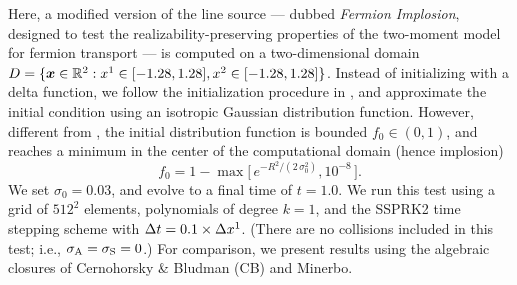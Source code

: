 Here, a modified version of the line source --- dubbed \emph{Fermion Implosion},  designed to test the realizability-preserving properties of the two-moment model for fermion transport --- is computed on a two-dimensional domain $D=\{\boldsymbol{x}\in\mathbb{R}^{2}:x^{1}\in[-1.28,1.28], x^{2}\in[-1.28,1.28]\}$.  
Instead of initializing with a delta function, we follow the initialization procedure in \cite{garrettHauck_2013}, and approximate the initial condition using an isotropic Gaussian distribution function.  
However, different from \cite{garrettHauck_2013}, the initial distribution function is bounded $f_{0}\in(0,1)$, and reaches a minimum in the center of the computational domain (hence implosion)
\begin{equation}
  f_{0}
  =1-\max\Big[\,e^{-R^{2}/(2\,\sigma_{0}^{2})},10^{-8}\,\Big].  
\end{equation}
We set $\sigma_{0}=0.03$, and evolve to a final time of $t=1.0$.  
We run this test using a grid of $512^{2}$ elements, polynomials of degree $k=1$, and the SSPRK2 time stepping scheme with $\Delta t=0.1\times\Delta x^{1}$.  
(There are no collisions included in this test; i.e., $\sigma_{{\rm A}}=\sigma_{{\rm S}}=0$.)  
For comparison, we present results using the algebraic closures of Cernohorsky \& Bludman (CB) and Minerbo.  

